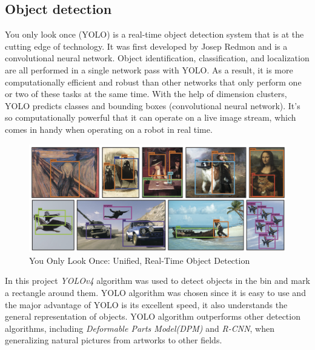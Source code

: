 \subsection{Object detection}\label{sec:yolo}
You only look once (YOLO) is a real-time object detection system that is at the cutting edge of technology\cite{redmon_yolov3_2018}. 
It was first developed by Josep Redmon and is a convolutional neural network.
Object identification, classification, and localization are all performed in a single network pass with YOLO. 
As a result, it is more computationally efficient and robust than other networks that only perform one or two of these tasks at the same time. 
With the help of dimension clusters, YOLO predicts classes and bounding boxes (convolutional neural network). 
It's so computationally powerful that it can operate on a live image stream, which comes in handy when operating on a robot in real time.
\begin{figure} [ht]
 \centering
 \includegraphics[width = 0.75 \textwidth]{graphics/yolo.PNG}
 \caption{You Only Look Once: Unified, Real-Time Object Detection \cite{redmon_you_2016}}
 \label{fig:yolo}
\end{figure}


In this project \textit{YOLOv4}\cite{bochkovskiy_yolov4_2020} algorithm was used to detect objects in the bin and mark a rectangle around them. 
YOLO algorithm was chosen since it is easy to use and the major advantage of YOLO is its excellent speed, it also understands the general representation of objects. YOLO algorithm outperforms other detection algorithms, including \textit{Deformable Parts Model(DPM)} and \textit{R-CNN}, when generalizing natural pictures from artworks to other fields\cite{zou_object_2019}.



